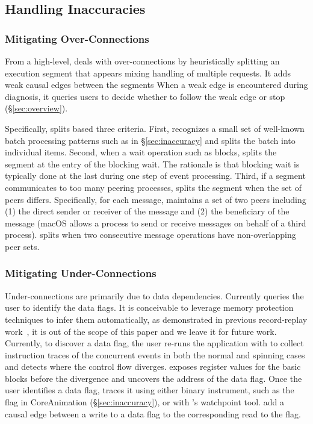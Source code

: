 \subsection{Handling Inaccuracies}


\subsubsection{Mitigating Over-Connections}\label{subsec:fix-over}

From a high-level, \xxx deals with over-connections by heuristically splitting
an execution segment that appears mixing handling of multiple requests. It adds
weak causal edges between the segments When a weak edge is encountered during
diagnosis, it queries users to decide whether to follow the weak edge or stop
(\S\ref{sec:overview}).

Specifically, \xxx splits based three criteria. First, \xxx recognizes a small
set of well-known batch processing patterns such as 
in \S\ref{sec:inaccuracy} and splits the batch into individual items. Second,
when a wait operation such as  blocks, \xxx splits the segment at the
entry of the blocking wait. The rationale is that blocking wait is typically
done at the last during one step of event processing. Third, if a segment
communicates to too many peering processes, \xxx splits the segment when the
set of peers differs. Specifically, for each message, \xxx maintains a set
of two peers including (1) the direct sender or receiver of the message and
(2) the beneficiary of the message (macOS allows a process to send or receive
messages on behalf of a third process). \xxx splits when two consecutive message
operations have non-overlapping peer sets.

\subsubsection{Mitigating Under-Connections}\label{subsec:fix-under}

Under-connections are primarily due to data dependencies. Currently \xxx
queries the user to identify the data flags. It is conceivable to leverage
memory protection techniques to infer them automatically, as demonstrated in
previous record-replay work~\cite{king2005debugging, dunlap2008execution}, it
is out of the scope of this paper and we leave it for future work. Currently,
to discover a data flag, the user re-runs the application with \xxx to collect
instruction traces of the concurrent events in both the normal and spinning
cases and detects where the control flow diverges. \xxx exposes register
values for the basic blocks before the divergence and uncovers the address
of the data flag. Once the user identifies a data flag, \xxx traces it using
either binary instrument, such as the  flag in CoreAnimation
(\S\ref{sec:inaccuracy}), or with \xxx's watchpoint tool. \xxx add a causal edge
between a write to a data flag to the corresponding read to the flag.
